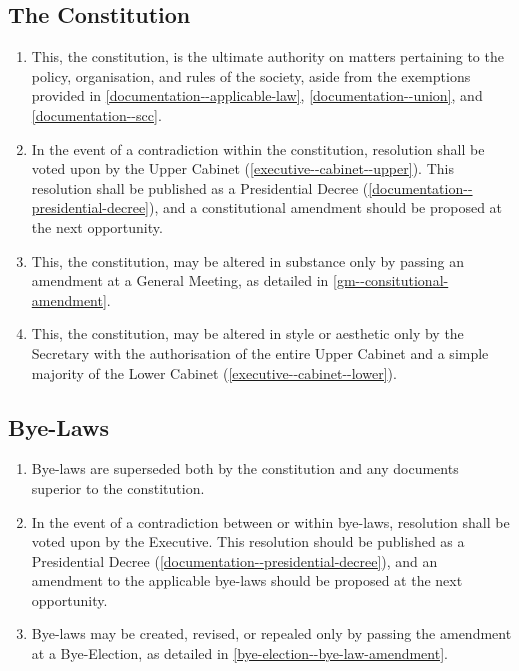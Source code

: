 \documentclass{scrartcl}
\begin{document}
        \subsection{The Constitution}
            \label{documentation--constitution}
            \begin{enumerate}
                \item This, the constitution, is the ultimate authority on matters pertaining to the policy, organisation, and rules of the society, aside from the exemptions provided in \ref{documentation--applicable-law}, \ref{documentation--union}, and \ref{documentation--scc}.
                \item In the event of a contradiction within the constitution, resolution shall be voted upon by the Upper Cabinet (\ref{executive--cabinet--upper}). This resolution shall be published as a Presidential Decree (\ref{documentation--presidential-decree}), and a constitutional amendment should be proposed at the next opportunity.
                \item This, the constitution, may be altered in substance only by passing an amendment at a General Meeting, as detailed in \ref{gm--consitutional-amendment}.
                \item This, the constitution, may be altered in style or aesthetic only by the Secretary with the authorisation of the entire Upper Cabinet and a simple majority of the Lower Cabinet (\ref{executive--cabinet--lower}).
            \end{enumerate}

        \subsection{Bye-Laws}
            \label{documentation--bye-law}
            \begin{enumerate}
                \item Bye-laws are superseded both by the constitution and any documents superior to the constitution.
                \item In the event of a contradiction between or within bye-laws, resolution shall be voted upon by the Executive. This resolution should be published as a Presidential Decree (\ref{documentation--presidential-decree}), and an amendment to the applicable bye-laws should be proposed at the next opportunity.
                \item Bye-laws may be created, revised, or repealed only by passing the amendment at a Bye-Election, as detailed in \ref{bye-election--bye-law-amendment}.
            \end{enumerate}
\end{document}
